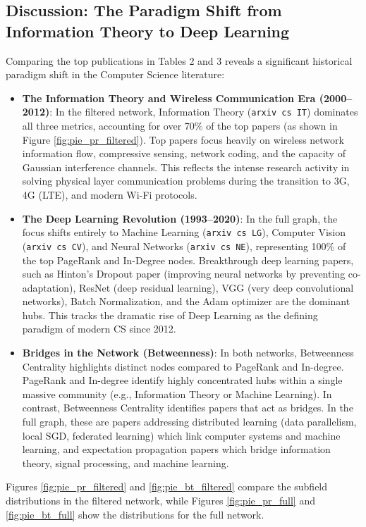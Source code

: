 \documentclass[11pt,a4paper]{article}
\begin{document}
\subsection{Discussion: The Paradigm Shift from Information Theory to Deep Learning}
Comparing the top publications in Tables 2 and 3 reveals a significant historical paradigm shift in the Computer Science literature:
\begin{itemize}
    \item \textbf{The Information Theory and Wireless Communication Era (2000--2012)}: In the filtered network, Information Theory (\texttt{arxiv cs IT}) dominates all three metrics, accounting for over 70\% of the top papers (as shown in Figure \ref{fig:pie_pr_filtered}). Top papers focus heavily on wireless network information flow, compressive sensing, network coding, and the capacity of Gaussian interference channels. This reflects the intense research activity in solving physical layer communication problems during the transition to 3G, 4G (LTE), and modern Wi-Fi protocols.
    \item \textbf{The Deep Learning Revolution (1993--2020)}: In the full graph, the focus shifts entirely to Machine Learning (\texttt{arxiv cs LG}), Computer Vision (\texttt{arxiv cs CV}), and Neural Networks (\texttt{arxiv cs NE}), representing 100\% of the top PageRank and In-Degree nodes. Breakthrough deep learning papers, such as Hinton's Dropout paper (improving neural networks by preventing co-adaptation), ResNet (deep residual learning), VGG (very deep convolutional networks), Batch Normalization, and the Adam optimizer are the dominant hubs. This tracks the dramatic rise of Deep Learning as the defining paradigm of modern CS since 2012.
    \item \textbf{Bridges in the Network (Betweenness)}: In both networks, Betweenness Centrality highlights distinct nodes compared to PageRank and In-degree. PageRank and In-degree identify highly concentrated hubs within a single massive community (e.g., Information Theory or Machine Learning). In contrast, Betweenness Centrality identifies papers that act as bridges. In the full graph, these are papers addressing distributed learning (data parallelism, local SGD, federated learning) which link computer systems and machine learning, and expectation propagation papers which bridge information theory, signal processing, and machine learning.
\end{itemize}

Figures \ref{fig:pie_pr_filtered} and \ref{fig:pie_bt_filtered} compare the subfield distributions in the filtered network, while Figures \ref{fig:pie_pr_full} and \ref{fig:pie_bt_full} show the distributions for the full network.
\end{document}
